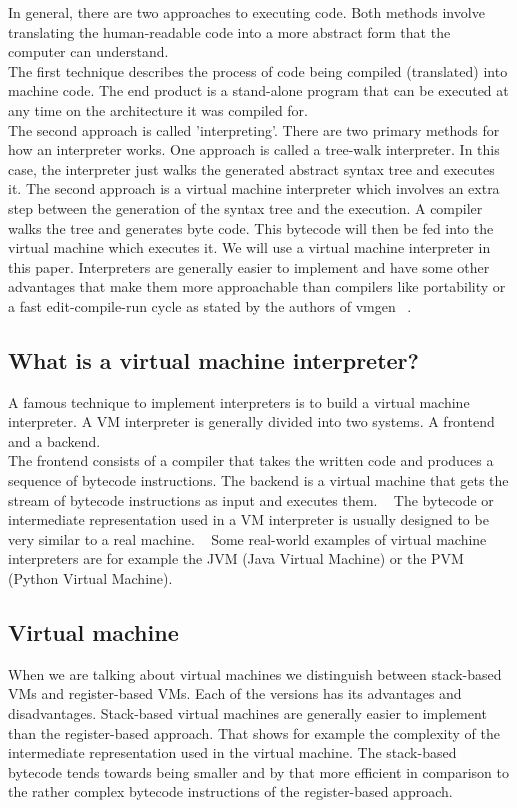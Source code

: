 \documentclass{article}
\begin{document}
In general, there are two approaches to executing code. Both methods involve
translating the human-readable code into a more abstract form that the computer
can understand. \\

The first technique describes the process of code being compiled (translated)
into machine code. The end product is a stand-alone program that can be
executed at any time on the architecture it was compiled for. \\

The second approach is called 'interpreting'. There are two primary methods for
how an interpreter works. One approach is called a tree-walk interpreter. In
this case, the interpreter just walks the generated abstract syntax tree and
executes it. The second approach is a virtual machine interpreter which
involves an extra step between the generation of the syntax tree and the
execution. A compiler walks the tree and generates byte code. This bytecode
will then be fed into the virtual machine which executes it. We will use a
virtual machine interpreter in this paper. Interpreters are generally easier to
implement and have some other advantages that make them more approachable than
compilers like portability or a fast edit-compile-run cycle as stated by the
authors of vmgen ~\cite{vmgen}. 

\subsection{What is a virtual machine interpreter?}
A famous technique to implement interpreters is to build a virtual machine
interpreter. A VM interpreter is generally divided into two systems. A frontend
and a backend. ~\cite{vmgen} \\

The frontend consists of a compiler that takes the written code and produces a
sequence of bytecode instructions. The backend is a virtual machine that gets
the stream of bytecode instructions as input and executes them. ~\cite{vmgen}
The bytecode or intermediate representation used in a VM interpreter is usually
designed to be very similar to a real machine. ~\cite{vmgen} Some real-world
examples of virtual machine interpreters are for example the JVM (Java Virtual
Machine) or the PVM (Python Virtual Machine).
\\
\subsection{Virtual machine}
When we are talking about virtual machines we distinguish between stack-based
VMs and register-based VMs. Each of the versions has its advantages and
disadvantages. Stack-based virtual machines are generally easier to implement
than the register-based approach. That shows for example the complexity of the
intermediate representation used in the virtual machine. The stack-based
bytecode tends towards being smaller and by that more efficient in comparison
to the rather complex bytecode instructions of the register-based approach.
\end{document}
